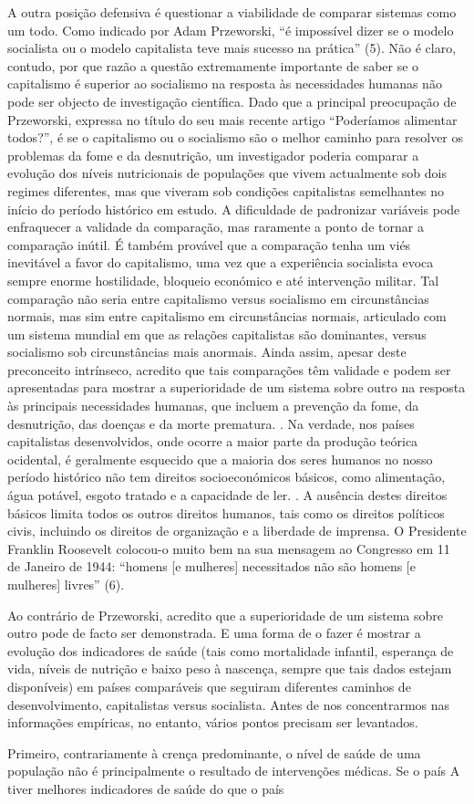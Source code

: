 A outra posição defensiva é questionar a viabilidade de comparar sistemas como um todo. Como indicado por Adam Przeworski, “é impossível dizer se o modelo socialista ou o modelo capitalista teve mais sucesso na prática” (5). Não é claro, contudo, por que razão a questão extremamente importante de saber se o capitalismo é superior ao socialismo na resposta às necessidades humanas não pode ser objecto de investigação científica. Dado que a principal preocupação de Przeworski, expressa no título do seu mais recente artigo “Poderíamos alimentar todos?”, é se o capitalismo ou o socialismo são o melhor caminho para resolver os problemas da fome e da desnutrição, um investigador poderia comparar a evolução dos níveis nutricionais de populações que vivem actualmente sob dois regimes diferentes, mas que viveram sob condições capitalistas semelhantes no início do período histórico em estudo. A dificuldade de padronizar variáveis ​​pode enfraquecer a validade da comparação, mas raramente a ponto de tornar a comparação inútil. É também provável que a comparação tenha um viés inevitável a favor do capitalismo, uma vez que a experiência socialista evoca sempre enorme hostilidade, bloqueio económico e até intervenção militar. Tal comparação não seria entre capitalismo versus socialismo em circunstâncias normais, mas sim entre capitalismo em circunstâncias normais, articulado com um sistema mundial em que as relações capitalistas são dominantes, versus socialismo sob circunstâncias mais anormais. Ainda assim, apesar deste preconceito intrínseco, acredito que tais comparações têm validade e podem ser apresentadas para mostrar a superioridade de um sistema sobre outro na resposta às principais necessidades humanas, que incluem a prevenção da fome, da desnutrição, das doenças e da morte prematura. . Na verdade, nos países capitalistas desenvolvidos, onde ocorre a maior parte da produção teórica ocidental, é geralmente esquecido que a maioria dos seres humanos no nosso período histórico não tem direitos socioeconómicos básicos, como alimentação, água potável, esgoto tratado e a capacidade de ler. . A ausência destes direitos básicos limita todos os outros direitos humanos, tais como os direitos políticos civis, incluindo os direitos de organização e a liberdade de imprensa. O Presidente Franklin Roosevelt colocou-o muito bem na sua mensagem ao Congresso em {\color{blue}11} de Janeiro de 1944: “homens [e mulheres] necessitados não são homens [e mulheres] livres” (6).
 \par 
Ao contrário de Przeworski, acredito que a superioridade de um sistema sobre outro pode de facto ser demonstrada. E uma forma de o fazer é mostrar a evolução dos indicadores de saúde (tais como mortalidade infantil, esperança de vida, níveis de nutrição e baixo peso à nascença, sempre que tais dados estejam disponíveis) em países comparáveis ​​que seguiram diferentes caminhos de desenvolvimento, capitalistas versus socialista. Antes de nos concentrarmos nas informações empíricas, no entanto, vários pontos precisam ser levantados.
 \par 
Primeiro, contrariamente à crença predominante, o nível de saúde de uma população não é principalmente o resultado de intervenções médicas. Se o país A tiver melhores indicadores de saúde do que o país
 \par 
